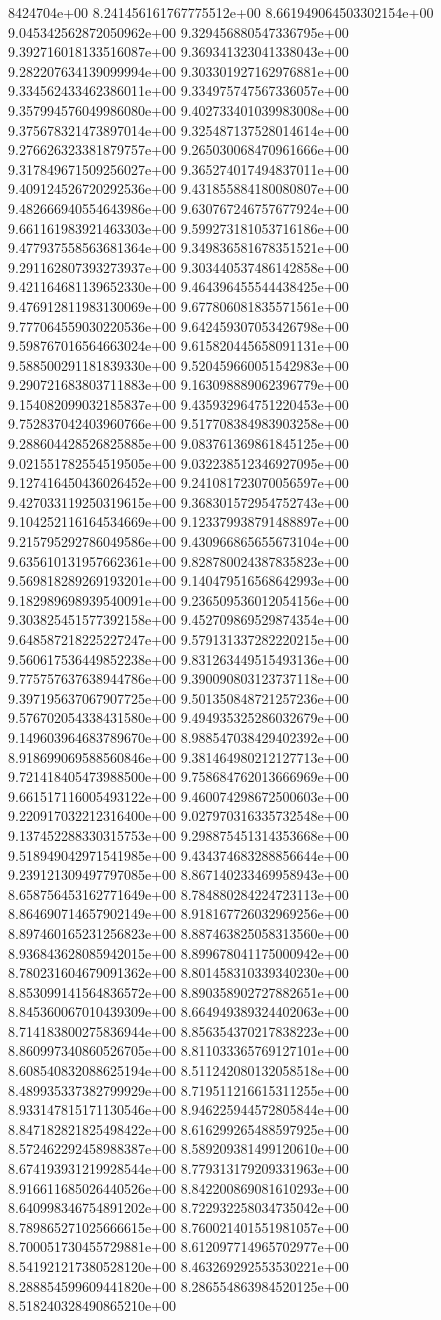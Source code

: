 8424704e+00	8.241456161767775512e+00	8.661949064503302154e+00	9.045342562872050962e+00	9.329456880547336795e+00	9.392716018133516087e+00	9.369341323041338043e+00	9.282207634139099994e+00	9.303301927162976881e+00	9.334562433462386011e+00	9.334975747567336057e+00	9.357994576049986080e+00	9.402733401039983008e+00	9.375678321473897014e+00	9.325487137528014614e+00	9.276626323381879757e+00	9.265030068470961666e+00	9.317849671509256027e+00	9.365274017494837011e+00	9.409124526720292536e+00	9.431855884180080807e+00	9.482666940554643986e+00	9.630767246757677924e+00	9.661161983921463303e+00	9.599273181053716186e+00	9.477937558563681364e+00	9.349836581678351521e+00	9.291162807393273937e+00	9.303440537486142858e+00	9.421164681139652330e+00	9.464396455544438425e+00	9.476912811983130069e+00	9.677806081835571561e+00	9.777064559030220536e+00	9.642459307053426798e+00	9.598767016564663024e+00	9.615820445658091131e+00	9.588500291181839330e+00	9.520459660051542983e+00	9.290721683803711883e+00	9.163098889062396779e+00	9.154082099032185837e+00	9.435932964751220453e+00	9.752837042403960766e+00	9.517708384983903258e+00	9.288604428526825885e+00	9.083761369861845125e+00	9.021551782554519505e+00	9.032238512346927095e+00	9.127416450436026452e+00	9.241081723070056597e+00	9.427033119250319615e+00	9.368301572954752743e+00	9.104252116164534669e+00	9.123379938791488897e+00	9.215795292786049586e+00	9.430966865655673104e+00	9.635610131957662361e+00	9.828780024387835823e+00	9.569818289269193201e+00	9.140479516568642993e+00	9.182989698939540091e+00	9.236509536012054156e+00	9.303825451577392158e+00	9.452709869529874354e+00	9.648587218225227247e+00	9.579131337282220215e+00	9.560617536449852238e+00	9.831263449515493136e+00	9.775757637638944786e+00	9.390090803123737118e+00	9.397195637067907725e+00	9.501350848721257236e+00	9.576702054338431580e+00	9.494935325286032679e+00	9.149603964683789670e+00	8.988547038429402392e+00	8.918699069588560846e+00	9.381464980212127713e+00	9.721418405473988500e+00	9.758684762013666969e+00	9.661517116005493122e+00	9.460074298672500603e+00	9.220917032212316400e+00	9.027970316335732548e+00	9.137452288330315753e+00	9.298875451314353668e+00	9.518949042971541985e+00	9.434374683288856644e+00	9.239121309497797085e+00	8.867140233469958943e+00	8.658756453162771649e+00	8.784880284224723113e+00	8.864690714657902149e+00	8.918167726032969256e+00	8.897460165231256823e+00	8.887463825058313560e+00	8.936843628085942015e+00	8.899678041175000942e+00	8.780231604679091362e+00	8.801458310339340230e+00	8.853099141564836572e+00	8.890358902727882651e+00	8.845360067010439309e+00	8.664949389324402063e+00	8.714183800275836944e+00	8.856354370217838223e+00	8.860997340860526705e+00	8.811033365769127101e+00	8.608540832088625194e+00	8.511242080132058518e+00	8.489935337382799929e+00	8.719511216615311255e+00	8.933147815171130546e+00	8.946225944572805844e+00	8.847182821825498422e+00	8.616299265488597925e+00	8.572462292458988387e+00	8.589209381499120610e+00	8.674193931219928544e+00	8.779313179209331963e+00	8.916611685026440526e+00	8.842200869081610293e+00	8.640998346754891202e+00	8.722932258034735042e+00	8.789865271025666615e+00	8.760021401551981057e+00	8.700051730455729881e+00	8.612097714965702977e+00	8.541921217380528120e+00	8.463269292553530221e+00	8.288854599609441820e+00	8.286554863984520125e+00	8.518240328490865210e+00